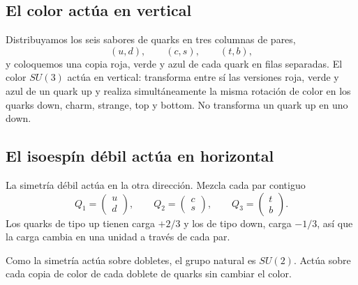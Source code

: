 \subsection{El color actúa en vertical}

Distribuyamos los seis sabores de quarks en tres columnas de pares,
\begin{equation}
(u,d),\qquad(c,s),\qquad(t,b),
\end{equation}
y coloquemos una copia roja, verde y azul de cada quark en filas separadas. El color \(SU(3)\) actúa en vertical: transforma entre sí las versiones roja, verde y azul de un quark up y realiza simultáneamente la misma rotación de color en los quarks down, charm, strange, top y bottom. No transforma un quark up en uno down.

\subsection{El isoespín débil actúa en horizontal}

La simetría débil actúa en la otra dirección. Mezcla cada par contiguo
\begin{equation}
Q_1=\begin{pmatrix}u\\d\end{pmatrix},
\qquad
Q_2=\begin{pmatrix}c\\s\end{pmatrix},
\qquad
Q_3=\begin{pmatrix}t\\b\end{pmatrix}.
\label{eq:l5-quark-doublets}
\end{equation}
Los quarks de tipo up tienen carga \(+2/3\) y los de tipo down, carga \(-1/3\), así que la carga cambia en una unidad a través de cada par.

Como la simetría actúa sobre dobletes, el grupo natural es \(SU(2)\). Actúa sobre cada copia de color de cada doblete de quarks sin cambiar el color.

